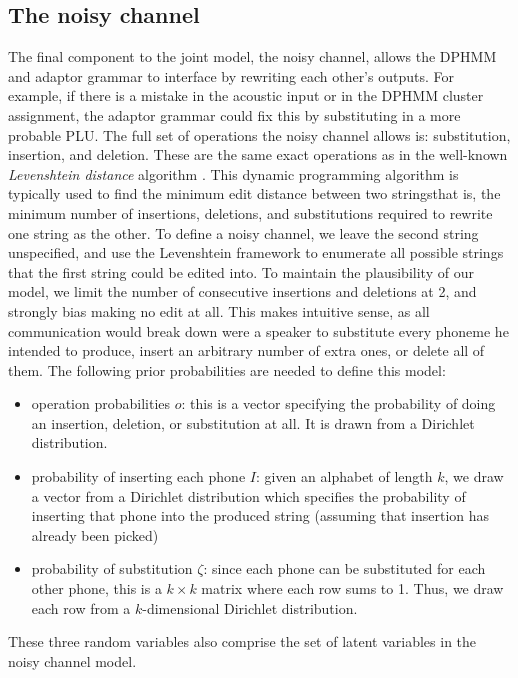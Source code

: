 \documentclass[12pt,letterpaper]{article}
\begin{document}
\subsection{The noisy channel}
The final component to the joint model, the noisy channel, allows the DPHMM and adaptor grammar to interface by rewriting each other's outputs. For example, if there is a mistake in the acoustic input or in the DPHMM cluster assignment, the adaptor grammar could fix this by substituting in a more probable PLU. The full set of operations the noisy channel allows is: substitution, insertion, and deletion. These are the same exact operations as in the well-known \textit{Levenshtein distance} algorithm \citep{levenshtein:1966}. This dynamic programming algorithm is typically used to find the minimum edit distance between two strings\textemdash that is, the minimum number of insertions, deletions, and substitutions required to rewrite one string as the other. To define a noisy channel, we leave the second string unspecified, and use the Levenshtein framework to enumerate all possible strings that the first string could be edited into. To maintain the plausibility of our model, we limit the number of consecutive insertions and deletions at 2, and strongly bias making no edit at all. This makes intuitive sense, as all communication would break down were a speaker to substitute every phoneme he intended to produce, insert an arbitrary number of extra ones, or delete all of them. The following prior probabilities are needed to define this model: 
\begin{itemize}
    \item operation probabilities $o$: this is a vector specifying the probability of doing an insertion, deletion, or substitution at all. It is drawn from a Dirichlet distribution.
    \item probability of inserting each phone $I$: given an alphabet of length $k$, we draw a vector from a Dirichlet distribution which specifies the probability of inserting that phone into the produced string (assuming that insertion has already been picked)
    \item probability of substitution $\zeta$: since each phone can be substituted for each other phone, this is a $k\times k$ matrix where each row sums to 1. Thus, we draw each row from a $k$-dimensional Dirichlet distribution. 
\end{itemize}

These three random variables also comprise the set of latent variables in the noisy channel model. 
\end{document}
